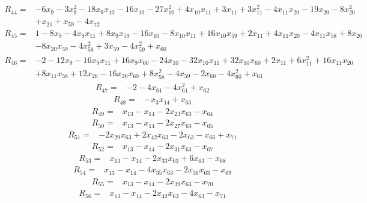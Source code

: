 \begin{align*}
 R_{44}={}&-6x_{9} -3x_{9}^{2} -18x_{9}x_{10} -16x_{10} -27x_{10}^{2} +4x_{10}x_{11} +3x_{11} +3x_{11}^{2} -4x_{11}x_{20} -19x_{20} -8x_{20}^{2}\\
 &+x_{21} +x_{59} -4x_{72}
\end{align*}
\begin{align*}
 R_{45}={}&1 -8x_{9} -4x_{9}x_{11} +8x_{9}x_{59} -16x_{10} -8x_{10}x_{11} +16x_{10}x_{59} +2x_{11} +4x_{11}x_{20} -4x_{11}x_{58} +8x_{20}\\
 &-8x_{20}x_{59} -4x_{58}^{2} +3x_{59} -4x_{59}^{2} +x_{60}
\end{align*}
\begin{align*}
 R_{46}={}&-2 -12x_{9} -16x_{9}x_{11} +16x_{9}x_{60} -24x_{10} -32x_{10}x_{11} +32x_{10}x_{60} +2x_{11} +6x_{11}^{2} +16x_{11}x_{20}\\
 &+8x_{11}x_{58} +12x_{20} -16x_{20}x_{60} +8x_{58}^{2} -4x_{59} -2x_{60} -4x_{60}^{2} +x_{61}
\end{align*}
\begin{align*}
 R_{47}={}&-2 -4x_{61} -4x_{61}^{2} +x_{62}
\end{align*}
\begin{align*}
 R_{48}={}&-x_{3}x_{14} +x_{63}
\end{align*}
\begin{align*}
 R_{49}={}&x_{13} -x_{14} -2x_{23}x_{63} -x_{64}
\end{align*}
\begin{align*}
 R_{50}={}&x_{13} -x_{14} -2x_{27}x_{63} -x_{65}
\end{align*}
\begin{align*}
 R_{51}={}&-2x_{29}x_{63} +2x_{42}x_{63} -2x_{63} -x_{66} +x_{71}
\end{align*}
\begin{align*}
 R_{52}={}&x_{13} -x_{14} -2x_{31}x_{63} -x_{67}
\end{align*}
\begin{align*}
 R_{53}={}&x_{13} -x_{14} -2x_{33}x_{63} +6x_{63} -x_{68}
\end{align*}
\begin{align*}
 R_{54}={}&x_{13} -x_{14} -4x_{35}x_{63} -2x_{36}x_{63} -x_{69}
\end{align*}
\begin{align*}
 R_{55}={}&x_{13} -x_{14} -2x_{39}x_{63} -x_{70}
\end{align*}
\begin{align*}
 R_{56}={}&x_{13} -x_{14} -2x_{42}x_{63} -4x_{63} -x_{71}
\end{align*}
